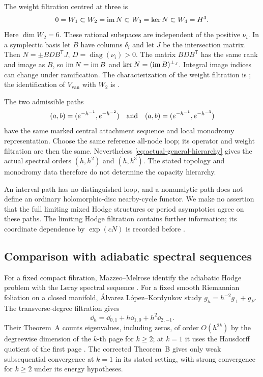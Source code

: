 The weight filtration centred at three is
\begin{equation}\label{eq:monodromy-weight-filtration}
 0=W_1\subset W_2=\operatorname{im} N
       \subset W_3=\ker N\subset W_4=H^3.
\end{equation}
Here $\dim W_2=6$. These rational subspaces
are independent of the positive $\nu_i$.
In a symplectic basis let $B$ have columns
$\delta_i$ and let $J$ be the intersection
matrix. Then $N=\pm BDB^{\mathsf T}J$,
$D=\operatorname{diag}(\nu_i)>0$.
The matrix $BDB^{\mathsf T}$ has the
same rank and image as $B$, so
$\operatorname{im} N=\operatorname{im} B$ and
$\ker N=(\operatorname{im} B)^{\perp_J}$.
Integral image indices can change under
ramification. The characterization of the
weight filtration is
\cite[Section~6, Lemma~(6.4)]{schmid};
the identification of $V_{\mathrm{van}}$
with $W_2$ is
\cite[Lemma~1.12]{lee-lin-wang}.

The two admissible paths
\[
 (a,b)=(e^{-h^{-1}},e^{-h^{-2}})
 \quad\hbox{and}\quad
 (a,b)=(e^{-h^{-1}},e^{-h^{-3}})
\]
have the same marked central attachment
sequence and local monodromy representation.
Choose the same reference all-node loop;
its operator and weight filtration are
then the same. Nevertheless
\eqref{eq:actual-general-hierarchy} gives
the actual spectral orders $(h,h^2)$ and
$(h,h^3)$. The stated topology and monodromy
data therefore do not determine the
capacity hierarchy.

An interval path has no distinguished loop,
and a nonanalytic path does not define an
ordinary holomorphic-disc nearby-cycle
functor. We make no assertion that the
full limiting mixed Hodge structures or
period asymptotics agree on these paths.
The limiting Hodge filtration contains
further information; its coordinate
dependence by $\exp(cN)$ is recorded
before \cite[Theorem~(6.16)]{schmid}.

\subsection{Comparison with adiabatic spectral sequences}

For a fixed compact fibration,
Mazzeo--Melrose identify the adiabatic
Hodge problem with the Leray spectral
sequence \cite[Theorems~(7), (15) and
Corollary~(18)]{mazzeo-melrose}.
For a fixed smooth Riemannian foliation
on a closed manifold, Álvarez
López--Kordyukov study
$g_h=h^{-2}g_\perp+g_F$.
The transverse-degree filtration gives
\[
 \dd_h=\dd_{0,1}+h\dd_{1,0}+h^2\dd_{2,-1}.
\]
Their Theorem~A counts eigenvalues,
including zeros, of order $O(h^{2k})$
by the degreewise dimension of the
$k$-th page for $k\ge2$; at $k=1$
it uses the Hausdorff quotient of
the first page \cite{alvarez-kordyukov}.
The corrected Theorem~B gives only
weak subsequential convergence at
$k=1$ in its stated setting, with
strong convergence for $k\ge2$
under its energy hypotheses.

